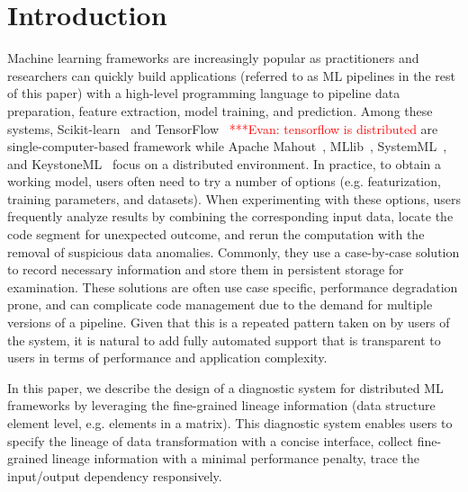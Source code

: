\documentclass{sig-alternate}
\newcommand{\evannote}[1]{{\textcolor{red}    { ***Evan:      #1 }}}
\newcommand{\evannote}[1]{}
\begin{document}
\section{Introduction}
Machine learning frameworks are increasingly popular as practitioners and researchers can quickly
build applications (referred to as ML pipelines in the rest of this paper) with a high-level 
programming language to pipeline data preparation, feature extraction, model training, 
and prediction. 
Among these systems, Scikit-learn~\cite{pedregosa2011scikit} and TensorFlow~\cite{tensorflow15} \evannote{tensorflow is distributed}
are single-computer-based framework while Apache Mahout~\cite{owen2011mahout}, MLlib~\cite{meng2015mllib}, 
SystemML~\cite{ghoting11systemml}, and KeystoneML~\cite{sparks15} focus on a distributed environment.
In practice, to obtain a working model, users often need to try a number of options (e.g. featurization, training parameters, and datasets). 
When experimenting with these options, users frequently analyze results by combining the corresponding input data,  
locate the code segment for unexpected outcome, and rerun the computation with the removal of suspicious data anomalies.
Commonly, they use a case-by-case solution to record necessary information and store them in persistent storage for examination.
These solutions are often use case specific, performance degradation prone, and can complicate code
management due to the demand for multiple versions of a pipeline.
Given that this is a repeated pattern taken on by users of the system, it is natural to add fully automated support 
that is transparent to users in terms of performance and application complexity.

In this paper, we describe the design of a diagnostic system for distributed ML frameworks by leveraging the fine-grained lineage information
(data structure element level, e.g. elements in a matrix).
This diagnostic system enables users to specify the lineage of data transformation with a concise interface, collect fine-grained lineage 
information with a minimal performance penalty, trace the input/output dependency responsively. 
\end{document}
